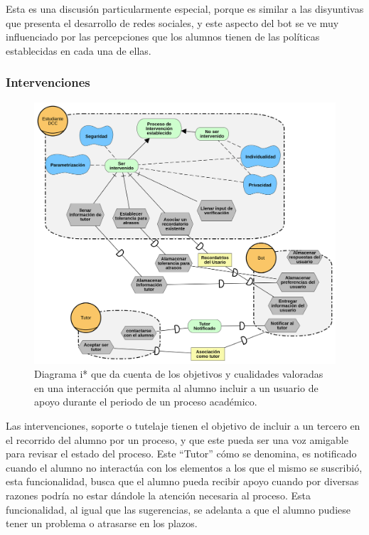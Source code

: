         \par Esta es una discusión particularmente especial, porque es similar a las disyuntivas que presenta el desarrollo de redes sociales, y este aspecto del bot se ve muy influenciado por las percepciones que los alumnos tienen de las políticas establecidas en cada una de ellas.

    \subsubsection{Intervenciones}
        \begin{figure}[ht]
            \centering
            \includegraphics[width=\textwidth]{media/diagramas/i_star/Intervenciones.png}
            \caption[Diagarma i* Intervenciones]{Diagrama i* que da cuenta de los objetivos y cualidades valoradas en una interacción que permita al alumno incluir a un usuario de apoyo durante el periodo de un proceso académico.}
            \label{}
        \end{figure}
        \par Las intervenciones, soporte o tutelaje tienen el objetivo de incluir a un tercero en el recorrido del alumno por un proceso, y que este pueda ser una voz amigable para revisar el estado del proceso. Este “Tutor” cómo se denomina, es notificado cuando el alumno no interactúa con los elementos a los que el mismo se suscribió, esta funcionalidad, busca que el alumno pueda recibir apoyo cuando por diversas razones podría no estar dándole la atención necesaria al proceso. Esta funcionalidad, al igual que las sugerencias, se adelanta a que el alumno pudiese tener un problema o atrasarse en los plazos.
